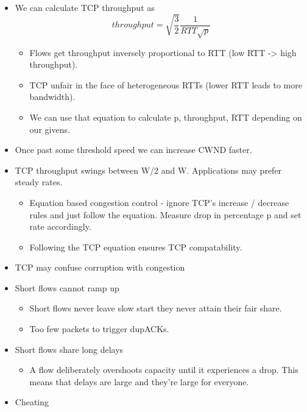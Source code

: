 \documentclass[]{article}
\providecommand{\tightlist}{%
  \setlength{\itemsep}{0pt}\setlength{\parskip}{0pt}}
\begin{document}
\begin{itemize}
  \begin{itemize}
  \tightlist
  \item
    We can calculate TCP throughput as
    \[throughput = \sqrt{\frac{3}{2}}\frac{1}{RTT \sqrt{p}}\]

    \begin{itemize}
    \tightlist
    \item
      Flows get throughput inversely proportional to RTT (low RTT
      -\textgreater{} high throughput).
    \item
      TCP unfair in the face of heterogeneous RTTs (lower RTT leads to
      more bandwidth).
    \item
      We can use that equation to calculate p, throughput, RTT depending
      on our givens.
    \end{itemize}
  \item
    Once past some threshold speed we can increase CWND faster.
  \item
    TCP throughput swings between W/2 and W. Applications may prefer
    steady rates.

    \begin{itemize}
    \tightlist
    \item
      Equation based congestion control - ignore TCP's increase /
      decrease rules and just follow the equation. Measure drop in
      percentage p and set rate accordingly.
    \item
      Following the TCP equation ensures TCP compatability.
    \end{itemize}
  \item
    TCP may confuse corruption with congestion
  \item
    Short flows cannot ramp up

    \begin{itemize}
    \tightlist
    \item
      Short flows never leave slow start they never attain their fair
      share.
    \item
      Too few packets to trigger dupACKs.
    \end{itemize}
  \item
    Short flows share long delays

    \begin{itemize}
    \tightlist
    \item
      A flow deliberately overshoots capacity until it experiences a
      drop. This means that delays are large and they're large for
      everyone.
    \end{itemize}
  \item
    Cheating


\end{itemize}
\end{itemize}
\end{document}
